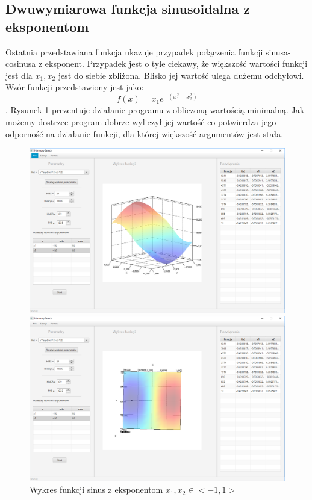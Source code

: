 \documentclass[10pt, a4paper]{article}
\begin{document}
\subsection{Dwuwymiarowa funkcja sinusoidalna z eksponentom}
\label{subsec:sinexp}
Ostatnia przedstawiana funkcja ukazuje przypadek połączenia funkcji sinusa-cosinusa z eksponent. Przypadek jest o tyle ciekawy, że większość wartości funkcji jest dla {\em $x_{1}, x_{2}$} jest do siebie zbliżona. Blisko jej wartość ulega dużemu odchyłowi.  Wzór funkcji przedstawiony jest jako: $$f(x)=x_{1}e^{-(x_{1}^{2}+x_{2}^2)}$$. Rysunek \ref{fig:9} prezentuje działanie programu z obliczoną wartością minimalną. Jak możemy dostrzec program dobrze wyliczył jej wartość co potwierdza jego odporność na działanie funkcji, dla której większość argumentów jest stała. 
\begin{figure}[htbp] 
	\begin{minipage}[b]{.5\textwidth}
		\centering
		\includegraphics[width=\linewidth]{images/91.PNG}
	\end{minipage} 
	\begin{minipage}[b]{.5\textwidth}
		\centering
		\includegraphics[width=\linewidth]{images/92.PNG} 
	\end{minipage}
	\label{fig:9}
	\caption{Wykres funkcji sinus z eksponentom $x_{1}, x_{2} \in <-1,1>$}
\end{figure}
\end{document}
